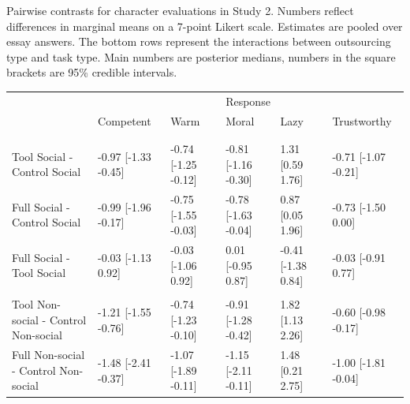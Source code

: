 \documentclass[
  man,
  floatsintext,
  longtable,
  nolmodern,
  notxfonts,
  notimes,
  colorlinks=true,linkcolor=blue,citecolor=blue,urlcolor=blue]{apa7}
\begin{document}
\newpage

\begin{supptbl}[H]

\caption{\label{supptbl-treatment-diffs-person-study2}Pairwise contrasts
for character evaluations in Study 2. Numbers reflect differences in
marginal means on a 7-point Likert scale. Estimates are pooled over
essay answers. The bottom rows represent the interactions between
outsourcing type and task type. Main numbers are posterior medians,
numbers in the square brackets are 95\% credible intervals.}

\begin{minipage}{\linewidth}

\centering\begingroup\fontsize{7.5}{9.5}\selectfont

\begin{tabular}{llllll}
\toprule
\multicolumn{1}{c}{ } & \multicolumn{5}{c}{Response} \\
\cmidrule(l{3pt}r{3pt}){2-6}
  & Competent & Warm & Moral & Lazy & Trustworthy\\
\midrule
\addlinespace[0.3em]
\multicolumn{6}{l}{\textbf{Effect of outsourcing type}}\\
\addlinespace[0.3em]
\multicolumn{6}{l}{\textbf{  Task type = Social}}\\
\hspace{1em}Tool Social - Control Social & -0.97 [-1.33 -0.45] & -0.74 [-1.25 -0.12] & -0.81 [-1.16 -0.30] & 1.31 [0.59 1.76] & -0.71 [-1.07 -0.21]\\
\hspace{1em}Full Social - Control Social & -0.99 [-1.96 -0.17] & -0.75 [-1.55 -0.03] & -0.78 [-1.63 -0.04] & 0.87 [0.05 1.96] & -0.73 [-1.50 0.00]\\
\hspace{1em}Full Social - Tool Social & -0.03 [-1.13 0.92] & -0.03 [-1.06 0.92] & 0.01 [-0.95 0.87] & -0.41 [-1.38 0.84] & -0.03 [-0.91 0.77]\\
\addlinespace[0.3em]
\multicolumn{6}{l}{\textbf{  Task type = Non-social}}\\
\hspace{1em}Tool Non-social - Control Non-social & -1.21 [-1.55 -0.76] & -0.74 [-1.23 -0.10] & -0.91 [-1.28 -0.42] & 1.82 [1.13 2.26] & -0.60 [-0.98 -0.17]\\
\hspace{1em}Full Non-social - Control Non-social & -1.48 [-2.41 -0.37] & -1.07 [-1.89 -0.11] & -1.15 [-2.11 -0.11] & 1.48 [0.21 2.75] & -1.00 [-1.81 -0.04]\\

\end{tabular}
\end{minipage}
\end{supptbl}
\end{document}
